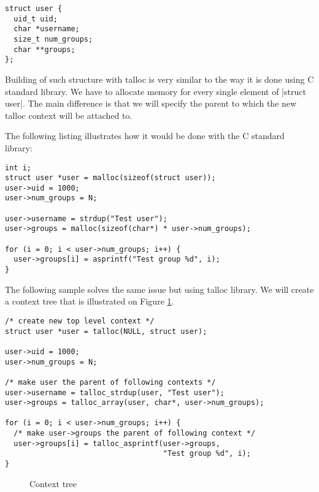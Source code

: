 \begin{lstlisting}[caption={struct user},label={struct-user}]
struct user {
  uid_t uid;
  char *username;
  size_t num_groups;
  char **groups;
};
\end{lstlisting}

Building of such structure with talloc is very similar to the way it is done
using C standard library. We have to allocate memory for every single element of
|struct user|. The main difference is that we will specify the parent to which
the new talloc context will be attached to.

The following listing illustrates how it would be done with the C standard
library:

\begin{lstlisting}[caption={Building struct user -- C standard library}]
int i;
struct user *user = malloc(sizeof(struct user));
user->uid = 1000;
user->num_groups = N;

user->username = strdup("Test user");
user->groups = malloc(sizeof(char*) * user->num_groups);

for (i = 0; i < user->num_groups; i++) {
  user->groups[i] = asprintf("Test group %d", i);
}
\end{lstlisting}

\noindent
The following sample solves the same issue but using talloc library. We will
create a context tree that is illustrated on Figure
\ref{fig:context-tree-1-user}.

\begin{lstlisting}[caption={Building struct user -- talloc library},
label={lst:context-tree-user},
morekeywords={talloc,talloc_strdup,talloc_array,talloc_asprintf}]
/* create new top level context */
struct user *user = talloc(NULL, struct user);

user->uid = 1000;
user->num_groups = N;

/* make user the parent of following contexts */
user->username = talloc_strdup(user, "Test user");
user->groups = talloc_array(user, char*, user->num_groups);

for (i = 0; i < user->num_groups; i++) {
  /* make user->groups the parent of following context */
  user->groups[i] = talloc_asprintf(user->groups,
                                    "Test group %d", i);
}
\end{lstlisting}

\begin{figure}[H]
  \centering
  
  \caption{Context tree}
  \label{fig:context-tree-1-user}
\end{figure}

